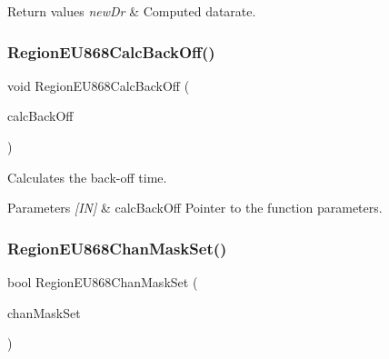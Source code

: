 \begin{DoxyRetVals}{Return values}
{\em new\+Dr} & Computed datarate. \\
\hline
\end{DoxyRetVals}
\mbox{\label{group__REGIONEU868_ga0900ea63994bf51a3ee43bd4917e5647}} 
\subsubsection{\texorpdfstring{Region\+E\+U868\+Calc\+Back\+Off()}{RegionEU868CalcBackOff()}}
{\footnotesize\ttfamily void Region\+E\+U868\+Calc\+Back\+Off (\begin{DoxyParamCaption}\item[{\hyperlink{group__REGION_ga7c5c9a8da174e6679eded8257dc92fd9}{Calc\+Back\+Off\+Params\+\_\+t} $\ast$}]{calc\+Back\+Off }\end{DoxyParamCaption})}



Calculates the back-\/off time. 


\begin{DoxyParams}{Parameters}
{\em \mbox{[}\+I\+N\mbox{]}} & calc\+Back\+Off Pointer to the function parameters. \\
\hline
\end{DoxyParams}
\mbox{\label{group__REGIONEU868_ga8c63acfe556cf427ba83e5429f2ec1d9}} 
\subsubsection{\texorpdfstring{Region\+E\+U868\+Chan\+Mask\+Set()}{RegionEU868ChanMaskSet()}}
{\footnotesize\ttfamily bool Region\+E\+U868\+Chan\+Mask\+Set (\begin{DoxyParamCaption}\item[{\hyperlink{group__REGION_ga6d24f7da136006410827dfb29f6b9b9e}{Chan\+Mask\+Set\+Params\+\_\+t} $\ast$}]{chan\+Mask\+Set }\end{DoxyParamCaption})}



